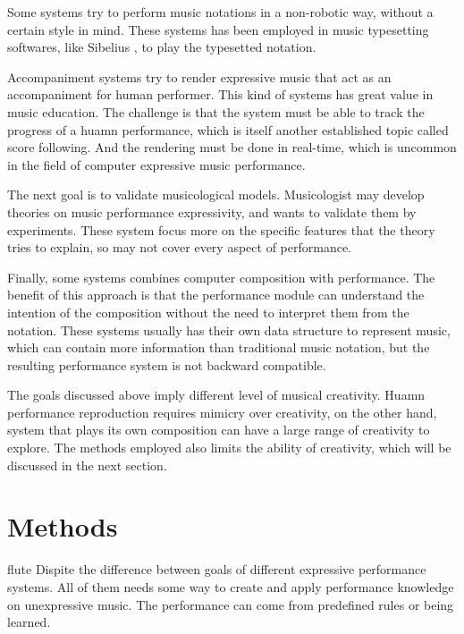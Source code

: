 Some systems try to perform music notations in a non-robotic way, without a certain style in mind. These systems has been employed in music typesetting softwares, like Sibelius \cite{sibelius}, to play the typesetted notation. 

Accompaniment systems try to render expressive music that act as an accompaniment for human performer. This kind of systems has great value in music education. The challenge is that the system must be able to track the progress of a huamn performance, which is itself another established topic called score following. And the rendering must be done in real-time, which is uncommon in the field of computer expressive music performance.

The next goal is to validate musicological models. Musicologist may develop theories on music performance expressivity, and wants to validate them by experiments. These system focus more on the specific features that the theory tries to explain, so may not cover every aspect of performance.

Finally, some systems combines computer composition with performance. The benefit of this approach is that the performance module can understand the intention of the composition without the need to interpret them from the notation. These systems usually has their own data structure to represent music, which can contain more information than traditional music notation, but the resulting performance system is not backward compatible.

The goals discussed above imply different level of musical creativity. Huamn performance reproduction requires mimicry over creativity, on the other hand, system that plays its own composition can have a large range of creativity to explore. The methods employed also limits the ability of creativity, which will be discussed in the next section.

\section{Methods}
flute
Dispite the difference between goals of different expressive performance systems. All of them needs some way to create and apply performance knowledge on unexpressive music. The performance can come from predefined rules or being learned. 

